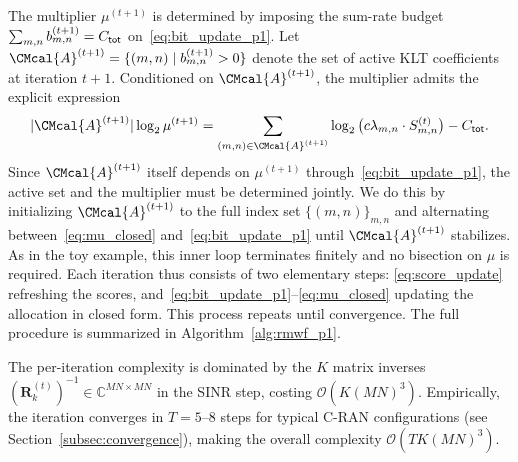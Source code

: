 \documentclass[10pt, twocolumn, comsoc]{IEEEtran}
\newtheorem{remark}{Remark}
\begin{document}
The multiplier $\mu^{(t+1)}$ is determined by 
imposing the sum-rate budget 
$\sum_{m,n} b_{m,n}^{(t+1)} = C_{\sf tot}$ 
on~\eqref{eq:bit_update_p1}. Let 
$\CMcal{A}^{(t+1)} = \{(m, n) \mid b_{m,n}^{(t+1)} > 0\}$ 
denote the set of active KLT coefficients at 
iteration $t+1$. Conditioned on 
$\CMcal{A}^{(t+1)}$, the multiplier admits the 
explicit expression
\begin{align} \label{eq:mu_closed}
  |\CMcal{A}^{(t+1)}|\log_2 \mu^{(t+1)} 
  = \sum_{(m,n) \in \CMcal{A}^{(t+1)}} 
    \log_2 \big(c\lambda_{m,n} \cdot S_{m,n}^{(t)}\big) 
  - C_{\sf tot}.
\end{align}
Since $\CMcal{A}^{(t+1)}$ itself depends on $\mu^{(t+1)}$ through~\eqref{eq:bit_update_p1}, the active set and the multiplier must be determined jointly. 
We do this by initializing $\CMcal{A}^{(t+1)}$ to the full index set $\{(m, n)\}_{m,n}$ and alternating  between~\eqref{eq:mu_closed} and~\eqref{eq:bit_update_p1} until $\CMcal{A}^{(t+1)}$ stabilizes. 
As in the toy example, this inner loop terminates finitely and no bisection on $\mu$ is required. 
Each iteration thus consists of two elementary steps: \eqref{eq:score_update} refreshing the scores, and~\eqref{eq:bit_update_p1}--\eqref{eq:mu_closed} updating the allocation in closed form.
This process repeats until convergence. The full procedure is summarized in Algorithm~\ref{alg:rmwf_p1}.



The per-iteration complexity is dominated by the $K$ matrix inverses 
$(\mathbf{R}_k^{(t)})^{-1} \in \mathbb{C}^{MN \times MN}$ in the SINR step, 
costing $\mathcal{O}(K(MN)^3)$. Empirically, the iteration converges in 
$T = 5$--$8$ steps for typical C-RAN configurations 
(see Section~\ref{subsec:convergence}), making the overall complexity 
$\mathcal{O}(T K (MN)^3)$. 



\end{document}
